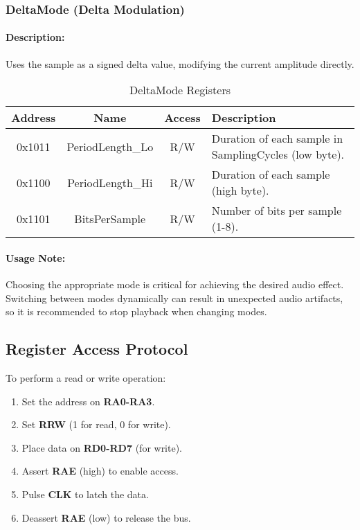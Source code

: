 \subsubsection{DeltaMode (Delta Modulation)}
\paragraph{Description:}
Uses the sample as a signed delta value, modifying the current amplitude directly.

\begin{table}[H]
    \centering
    \begin{tabular}{|c|c|c|l|}
        \hline
        \textbf{Address} & \textbf{Name}        & \textbf{Access} & \textbf{Description} \\
        \hline
        0x1011 & PeriodLength\_Lo & R/W & Duration of each sample in SamplingCycles (low byte). \\
        0x1100 & PeriodLength\_Hi & R/W & Duration of each sample (high byte). \\
        0x1101 & BitsPerSample    & R/W & Number of bits per sample (1-8). \\
        \hline
    \end{tabular}
    \caption{DeltaMode Registers}
\end{table}

\paragraph{Usage Note:}
Choosing the appropriate mode is critical for achieving the desired audio effect. Switching between modes dynamically can result in unexpected audio artifacts, so it is recommended to stop playback when changing modes.

\subsection{Register Access Protocol}
To perform a read or write operation:
\begin{enumerate}
    \item Set the address on \textbf{RA0-RA3}.
    \item Set \textbf{RRW} (1 for read, 0 for write).
    \item Place data on \textbf{RD0-RD7} (for write).
    \item Assert \textbf{RAE} (high) to enable access.
    \item Pulse \textbf{CLK} to latch the data.
    \item Deassert \textbf{RAE} (low) to release the bus.
\end{enumerate}
